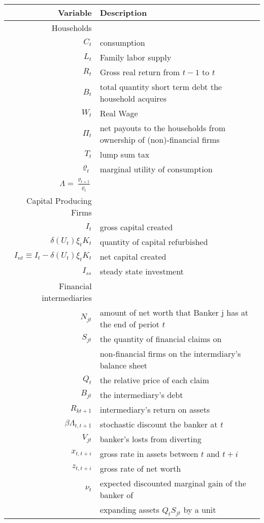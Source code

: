 \documentclass[document.tex]{subfiles}
\begin{document}
\begin{table}[H]
\begin{tabular}{rl}
\toprule
 Variable &  Description \\ \hline
Households & \\
$C_t$		& consumption \\	
 $L_t$		& Family labor supply \\	
 $R_t$		& Gross real return from $t-1$ to $t$ \\
$B_t$		& total quantity short term debt the household acquires\\		
 $W_t$		& Real Wage\\		
$\Pi_t$	& net payouts to the households from ownership of (non)-financial firms\\		
$T_t$	& lump sum tax\\
$\varrho_t$ & marginal utility of consumption\\
$\Lambda = \frac{\varrho_{t+1}}{\varrho_t}$ &  \\
Capital Producing Firms & \\	
$I_t$ & gross capital created \\
$\delta (U_t) \xi_t K_t$ & quantity of capital refurbished \\
$I_{nt} \equiv I_t - \delta (U_t) \xi_t K_t$ & net capital created\\
$I_{ss}$ & steady state investment \\
Financial intermediaries & \\	
 $N_{jt}$ & amount of net worth that Banker j has at the end of periot $t$ \\
$S_{jt}$ & the quantity of financial claims on \\
& non-financial firms on the intermdiary's balance sheet\\
$Q_t$ & the relative price of each claim \\
$B_{jt}$& the intermediary's debt \\
$R_{kt+1}$ & intermediary's return on assets \\
$\beta \Lambda_{t,t+1}$ & stochastic discount the banker at $t$ \\
$V_{jt} $& banker's losts from diverting\\
$x_{t,t+i}$ & gross rate in assets between $t$ and $t+i$ 		\\
$z_{t,t+i}$ & gross rate of net worth \\
 $\nu_t$ & expected discounted marginal gain of the banker of \\
&expanding assets $Q_t S_{jt}$ by a unit \\

\end{tabular}
\end{table}
\end{document}
